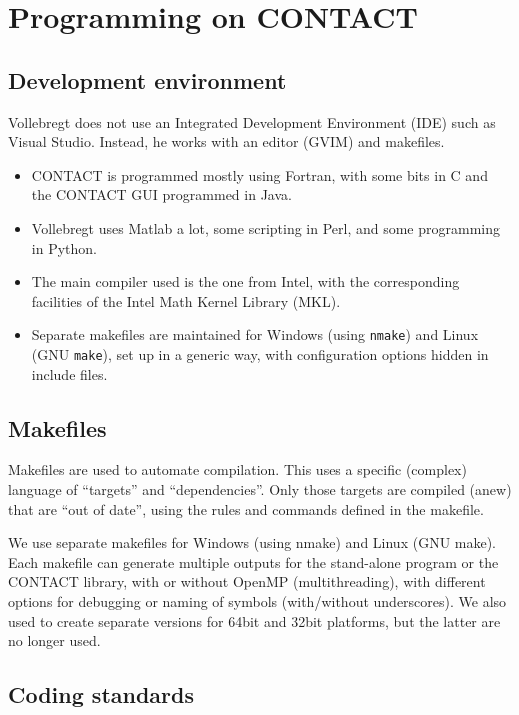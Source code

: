 \documentclass[12pt]{report}
\begin{document}
\chapter{Programming on CONTACT}

\section{Development environment}

Vollebregt does not use an Integrated Development Environment (IDE) such as
Visual Studio. Instead, he works with an editor (GVIM) and makefiles.
\begin{itemize}
\item CONTACT is programmed mostly using Fortran, with some bits in C and
        the CONTACT GUI programmed in Java.
\item Vollebregt uses Matlab a lot, some scripting in Perl, and some
        programming in Python.
\item The main compiler used is the one from Intel, with the corresponding
        facilities of the Intel Math Kernel Library (MKL).
\item Separate makefiles are maintained for Windows (using {\tt nmake}) and
        Linux (GNU {\tt make}), set up in a generic way, with configuration
        options hidden in include files.
\end{itemize}

\section{Makefiles}

Makefiles are used to automate compilation. This uses a specific (complex)
language of ``targets'' and ``dependencies''. Only those targets are
compiled (anew) that are ``out of date'', using the rules and commands
defined in the makefile.

We use separate makefiles for Windows (using nmake) and Linux (GNU make).
Each makefile can generate multiple outputs for the stand-alone program or
the CONTACT library, with or without OpenMP (multithreading), with
different options for debugging or naming of symbols (with/without
underscores). We also used to create separate versions for 64bit and 32bit
platforms, but the latter are no longer used.

\section{Coding standards}
\end{document}
